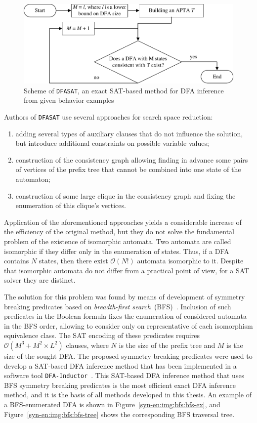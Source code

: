 \begin{figure}[ht]
  \centering
  \includegraphics[scale=0.9]{img/ntv/basic-en.pdf}
  \caption{Scheme of \texttt{DFASAT}, an exact SAT-based method for DFA inference from given behavior examples}
  \label{syn-en:img:dfasat-algo}
\end{figure}

Authors of \texttt{DFASAT} use several approaches for search space reduction:
\begin{enumerate}
  \item adding several types of auxiliary clauses that do not influence the solution, but introduce additional constraints on possible variable values;
  \item construction of the consistency graph allowing finding in advance some pairs of vertices of the prefix tree that cannot be combined into one state of the automaton;
  \item construction of some large clique in the consistency graph and fixing the enumeration of this clique's vertices.
\end{enumerate}

Application of the aforementioned approaches yields a considerable increase of the efficiency of the original method, but they do not solve the fundamental problem of the existence
of isomorphic automata.
Two automata are called isomorphic if they differ only in the enumeration of states.
Thus, if a DFA contains $N$ states, then there exist $\mathcal{O}\left(N!\right)$ automata isomorphic to it.
Despite that isomorphic automata do not differ from a practical point of view, for a SAT solver they are distinct.

The solution for this problem was found by means of development of symmetry breaking predicates based on \emph{breadth-first search}~(BFS)~\cite{zakirzyanov2015LATA}.
Inclusion of such predicates in the Boolean formula fixes the enumeration of considered automata in the BFS order, allowing to consider only on representative of each isomorphism 
equivalence class.
The SAT encoding of these predicates requires $\mathcal{O}\left(M^{3} + M^{2} \times L^{2}\right)$ clauses, where $N$ is the size of the prefix tree and $M$ is the size of the sought DFA.
The proposed symmetry breaking predicates were used to develop a SAT-based DFA inference method that has been implemented in a software tool \texttt{DFA-Inductor}~\cite{dfa-inductor-en}. This SAT-based DFA inference method that uses BFS symmetry breaking predicates is the most efficient exact DFA inference method, and it is the basis of all methods developed 
in this thesis.
An example of a BFS-enumerated DFA is shown in Figure~\ref{syn-en:img:bfs:bfs-ex}, and Figure~\ref{syn-en:img:bfs:bfs-tree} shows the corresponding BFS traversal tree.

